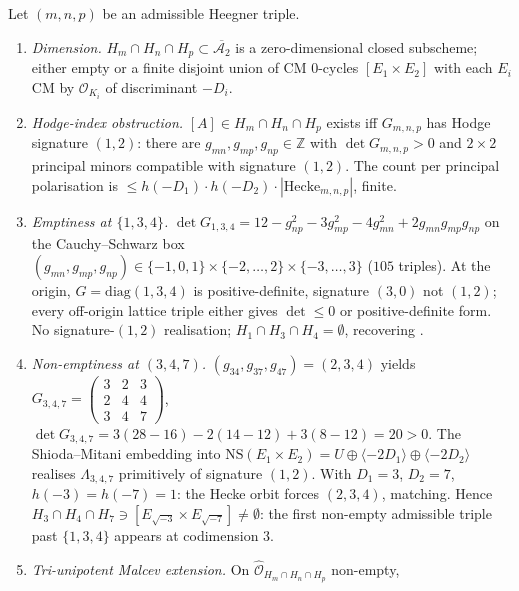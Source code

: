 \begin{theorem}
\label{thm:codim3-heegner-transversality}
\ClaimStatusConditional
{}%
%
%
Let $(m,n,p)$ be an admissible Heegner triple.
\begin{enumerate}[label=\textup{(\alph*)}]
\item \emph{Dimension.}
$H_m\cap H_n\cap H_p\subset\overline{\mathcal A_2}$ is a
zero-dimensional closed subscheme; either empty or a finite
disjoint union of CM $0$-cycles $[E_1\times E_2]$ with each $E_i$
CM by $\mathcal O_{K_i}$ of discriminant $-D_i$.
\item \emph{Hodge-index obstruction.}
$[A]\in H_m\cap H_n\cap H_p$ exists iff $G_{m,n,p}$ has Hodge
signature $(1,2)$: there are
$g_{mn},g_{mp},g_{np}\in\mathbb Z$ with $\det G_{m,n,p}>0$ and
$2\times 2$ principal minors compatible with signature $(1,2)$.
The count per principal polarisation is
$\leq h(-D_1)\cdot h(-D_2)\cdot |\mathrm{Hecke}_{m,n,p}|$, finite.
\item \emph{Emptiness at $\{1,3,4\}$.}
$\det G_{1,3,4}=12-g_{np}^2-3g_{mp}^2-4g_{mn}^2+2g_{mn}g_{mp}g_{np}$
on the Cauchy--Schwarz box
$(g_{mn},g_{mp},g_{np})\in\{-1,0,1\}\times\{-2,\ldots,2\}
\times\{-3,\ldots,3\}$ ($105$ triples). At the origin,
$G=\mathrm{diag}(1,3,4)$ is positive-definite, signature $(3,0)$
not $(1,2)$; every off-origin lattice triple either gives
$\det\leq 0$ or positive-definite form. No signature-$(1,2)$
realisation; $H_1\cap H_3\cap H_4=\emptyset$, recovering
\cite[\S 4]{Igusa72}.
\item \emph{Non-emptiness at $(3,4,7)$.}
$(g_{34},g_{37},g_{47})=(2,3,4)$ yields
$G_{3,4,7}=\begin{pmatrix}3&2&3\\ 2&4&4\\ 3&4&7\end{pmatrix}$,
$\det G_{3,4,7}=3(28-16)-2(14-12)+3(8-12)=20>0$. The Shioda--Mitani
embedding into
$\mathrm{NS}(E_1\times E_2)=U\oplus\langle-2D_1\rangle\oplus
\langle-2D_2\rangle$ realises $\Lambda_{3,4,7}$ primitively of
signature $(1,2)$. With $D_1=3$, $D_2=7$, $h(-3)=h(-7)=1$: the
Hecke orbit forces $(2,3,4)$, matching. Hence
$H_3\cap H_4\cap H_7\ni[E_{\sqrt{-3}}\times E_{\sqrt{-7}}]\neq\emptyset$:
the first non-empty admissible triple past $\{1,3,4\}$ appears at
codimension $3$.
\item \emph{Tri-unipotent Malcev extension.} On
$\widehat{\mathcal O}_{H_m\cap H_n\cap H_p}$ non-empty,

\end{enumerate}
\end{theorem}

